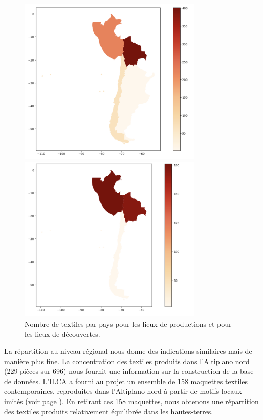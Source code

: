 \clearpage

\begin{figure}[!h]
    \begin{minipage}[c]{.5\linewidth}
            \begin{center}
                \includegraphics[height=8cm]{../images/map_count_prod.png}
            \end{center}
    \end{minipage}
        \begin{minipage}[c]{.5\linewidth}
        \begin{center}
        		\includegraphics[height=8cm]{../images/map_count_find.png}
	\end{center}
    \end{minipage}
    \caption{Nombre de textiles par pays pour les lieux de productions et pour les lieux de découvertes.}
    \label{fig:geo_count_country}   
\end{figure}

La répartition au niveau régional nous donne des indications similaires mais de manière plus fine. La concentration des textiles produits dans l'Altiplano nord (229 pièces sur 696) nous fournit une information sur la construction de la base de données. L'ILCA a fourni au projet un ensemble de 158 maquettes textiles contemporaines, reproduites dans l'Altiplano nord à partir de motifs locaux imités (voir page \pageref{fig:maquette}). En retirant ces 158 maquettes, nous obtenons une répartition des textiles produits relativement équilibrée dans les hautes-terres.

